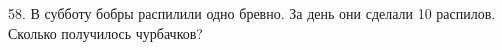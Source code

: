58. В субботу бобры распилили одно бревно. За день они сделали 10 распилов. Сколько получилось чурбачков?\\
